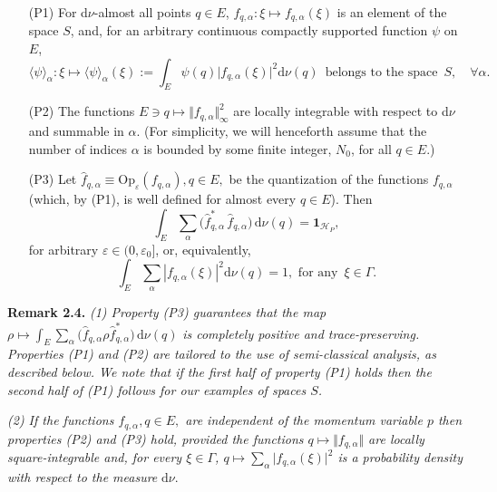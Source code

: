 \documentclass[11pt]{article}
\begin{document}
\vspace{0.15cm}
\begin{enumerate}
\item[(P1)]{For d$\nu$-almost all points $q\in E$, $f_{q, \alpha}: \xi \mapsto f_{q, \alpha}(\xi)$ is an element of the space $S$, and, 
for an arbitrary continuous compactly supported function $\psi$ on $E$,
$$\langle \psi \rangle_{\alpha}: \xi \mapsto \langle \psi\rangle_{\alpha}(\xi) :=\int_{E} \psi(q) \vert f_{q, \alpha}(\xi) \vert^{2} \text{d}\nu(q) \,\text{ belongs to the space }\, S, \quad \forall \alpha.$$}
\item[(P2)]{The functions $E\ni q \mapsto \Vert f_{q,\alpha} \Vert^{2}_\infty$ are locally integrable with respect to d$\nu$ 
and summable in $\alpha$. (For simplicity, we will henceforth assume that the number of indices $\alpha$ is bounded
 by some finite integer, $N_0$, for all $q\in E$.)}
\item[(P3)]{Let $\widehat{f}_{q,\alpha} \equiv \text{Op}_{\varepsilon}(f_{q, \alpha}), q\in E,$ be the quantization of the functions 
$f_{q, \alpha}$ (which, by (P1), is well defined for almost every $q\in E$). Then
\begin{equation}\label{tracepres}
\int_{E} \sum_{\alpha}\Big(\widehat{f}_{q, \alpha}^{*}\,\widehat{f}_{q,\alpha}\Big) \,\text{d}\nu(q) = \mathbf{1}_{\mathcal{H}_P},
\end{equation}
for arbitrary $\varepsilon \in (0, \varepsilon_0]$, or, equivalently,}
$$\int_E\sum_{\alpha}|f_{q,\alpha}(\xi)|^2\text{d} \nu(q)=1, \text{ for any }\, \xi\in \Gamma. $$
\end{enumerate}
{\bf{Remark 2.4.}} \textit{(1) Property (P3) guarantees that the map}
$\rho \mapsto \int_{E} \sum_{\alpha}\big(\widehat{f}_{q, \alpha} \rho \widehat{f}_{q, \alpha}^{*}\big)\,\text{d}\nu(q)$ 
\textit{is completely positive and trace-preserving. Properties (P1) and (P2) are tailored to the use of semi-classical 
analysis, as described below. We note that if the first half of property (P1) holds then the second half of
(P1) follows for our examples of spaces $S$.}

\textit{(2) If the functions $f_{q, \alpha}, q\in E,$ are \textit{independent} of the momentum variable $p$ then properties
(P2) and (P3) hold, provided the functions $q\mapsto \Vert f_{q, \alpha}\Vert$ are locally square-integrable and, 
for every $\xi\in \Gamma$, $q\mapsto \sum_{\alpha} \vert f_{q, \alpha}(\xi) \vert^{2}$ is a probability density with respect to the measure} $\text{d}\nu$.
\end{document}
